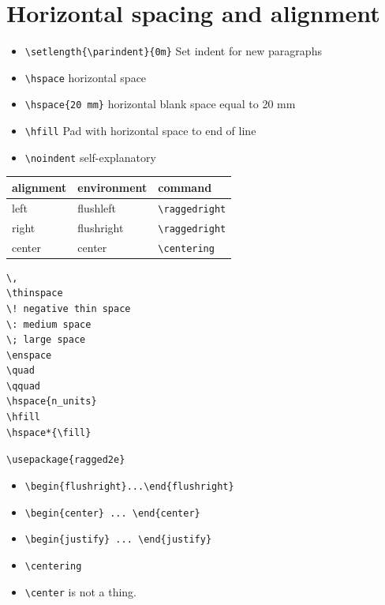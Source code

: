 \documentclass{article}
\begin{document}
\section{Horizontal spacing and alignment}
\begin{itemize}
    \item \verb|\setlength{\parindent}{0m}| Set indent for new paragraphs
    \item \verb|\hspace| horizontal space
    \item \verb|\hspace{20 mm}| horizontal blank space equal to 20 mm
    \item \verb|\hfill| Pad with horizontal space to end of line
    \item \verb|\noindent| self-explanatory
\end{itemize}

\begin{tabular}{l l l}
    alignment & environment & command\\
    \hline
    left & flushleft & \verb|\raggedright|\\
    right & flushright & \verb|\raggedright|\\
    center & center & \verb|\centering|\\
\end{tabular}

\begin{verbatim}
\,
\thinspace
\! negative thin space
\: medium space
\; large space
\enspace
\quad
\qquad
\hspace{n_units}
\hfill
\hspace*{\fill}
\end{verbatim}

\verb|\usepackage{ragged2e}|
\begin{itemize}
    \item \verb|\begin{flushright}...\end{flushright}|
    \item \verb|\begin{center} ... \end{center}|
    \item \verb|\begin{justify} ... \end{justify}|
    \item \verb|\centering|
    \item \verb|\center| is not a thing.
\end{itemize}
\end{document}
